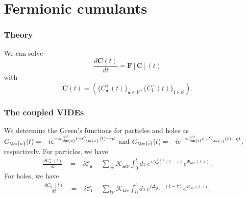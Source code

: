 \section{Fermionic cumulants}
\begin{frame}
    \frametitle{Theory}
We can solve
\begin{equation}
\frac{d\mathbf{C}(t)}{dt}
=
\mathbf{F}[\mathbf{C}](t)
\end{equation}
with
\begin{equation}
\mathbf{C}(t)
=
\left(
\{C_{\bm{a}}^{+}(t)\}_{\bm{a}\in\mathcal{V}},
\{C_{\bm{i}}^{-}(t)\}_{\bm{i}\in\mathcal{O}}
\right).
\end{equation}
\end{frame}
\begin{frame}
    \frametitle{The coupled VIDEs}
 We determine the Green's functions for particles and holes as $G_{\bm{a}}(t)=-i e^{-i\epsilon_{\bm{a}}^{\rm ref}t+C_{\bm{a}}^{+}(t)-\eta t}$ and $G_{\bm{i}}(t)=-i e^{-i\epsilon_{\bm{i}}^{\rm ref}t+C_{\bm{i}}^{-}(t)-\eta t}$, respectively. \pause
For particles, we have
\begin{align}
\frac{dC_{\bm{a}}^{+}(t)}{dt}
&=
-i\mathcal{C}_{\bm{a}}
-
\sum_{c\nu}
\mathcal{K}_{\bm{a}c\nu}
\int_0^t d\tau\,
e^{i\Delta_{\bm{a}c\nu}^{(+)}(t-\tau)}
e^{\Phi_{\bm{a}c\nu}(t,\tau)}.
\end{align}\pause
For holes, we have
\begin{align}
\frac{dC_{\bm{i}}^{-}(t)}{dt}
&= - i\mathcal{C}_{\bm{i}}
-
\sum_{k\nu}
\mathcal{K}_{\bm{i}k\nu}
\int_0^t d\tau\,
e^{i\Delta_{\bm{i}k\nu}^{(-)}(t-\tau)}
e^{\Psi_{\bm{i}k\nu}(t,\tau)}.
\end{align}
\end{frame}
